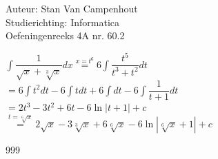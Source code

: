\documentclass[a4paper]{article}
\begin{document}
  
\noindent \large Auteur: Stan Van Campenhout \\
\noindent \large Studierichting:  Informatica\\
\noindent \large Oefeningenreeks 4A nr. 60.2\\

\medskip

\normalsize

$ \displaystyle\int\dfrac{1}{\sqrt{x}+\sqrt[3]{x}}dx \stackrel{x = t^6}{=} 6\displaystyle\int\dfrac{t^5}{t^3+t^2}dt $\\

$ = 6\displaystyle\int t^2dt - 6\displaystyle\int t dt + 6\displaystyle\int dt - 6\displaystyle\int\dfrac{1}{t+1}dt $\\

$ = 2t^3-3t^2+6t-6\ln\left|t+1\right|+c $\\

$ \stackrel{t = \sqrt[6]{x}}{=} 2\sqrt{x}-3\sqrt[3]{x}+6\sqrt[6]{x}-6\ln\left|\sqrt[6]{x}+1\right| + c $\\

\begin{thebibliography}{999}
\end{thebibliography}
\end{document}
